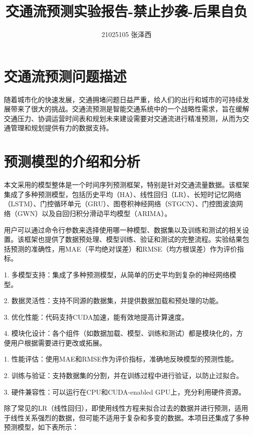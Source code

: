 \documentclass[4pt]{article}
\title{交通流预测实验报告-禁止抄袭-后果自负}
\author{21025105 张泽西}
\date{}
\begin{document}
\vspace{-10cm}
\maketitle

\section{交通流预测问题描述}

随着城市化的快速发展，交通拥堵问题日益严重，给人们的出行和城市的可持续发展带来了很大的挑战。交通流预测是智能交通系统中的一个战略性需求，旨在缓解交通压力、协调运营时间表和规划未来建设需要对交通流进行精准预测，从而为交通管理和规划提供有力的数据支持。

\section{预测模型的介绍和分析} 

本文采用的模型整体是一个时间序列预测框架\cite{teach2021}，特别是针对交通流量数据。该框架集成了多种预测模型，包括历史平均（HA）、线性回归（LR）、长短时记忆网络（LSTM）、门控循环单元（GRU）、图卷积神经网络（STGCN）、门控图波浪网络（GWN）以及自回归积分滑动平均模型（ARIMA）。

用户可以通过命令行参数来选择使用哪一种模型、数据集以及训练和测试的相关设置。该框架也提供了数据预处理、模型训练、验证和测试的完整流程。实验结果包括预测的准确性，用MAE（平均绝对误差）和RMSE（均方根误差）作为评价指标。

1. 多模型支持：集成了多种预测模型，从简单的历史平均到复杂的神经网络模型。

2. 数据灵活性：支持不同源的数据集，并提供数据加载和预处理的功能。

3. 优化性能：代码支持CUDA加速，能有效地提高计算速度。

4. 模块化设计：各个组件（如数据加载、模型、训练和测试）都是模块化的，方便用户根据需要进行更改或拓展。

1. 性能评估：使用MAE和RMSE作为评价指标，准确地反映模型的预测性能。

2. 训练与验证：支持数据集的分割，并在训练过程中进行验证，以防止过拟合。

3. 硬件兼容性：可以运行在CPU和CUDA-enabled GPU上，充分利用硬件资源。

除了常见的LR（线性回归），即使用线性方程来拟合过去的数据并进行预测，适用于线性关系强烈的数据，但可能不适用于复杂和多变的数据。本项目还集成了多种预测模型，如下表所示：
    
\end{document}
